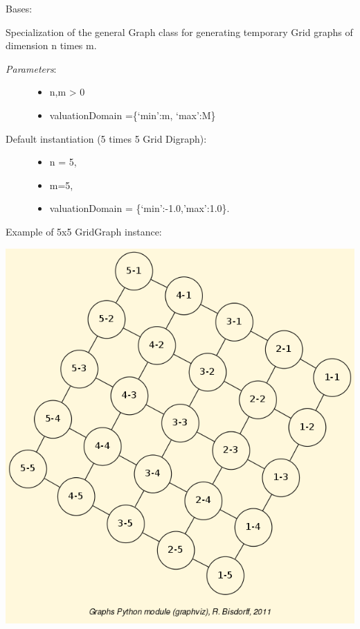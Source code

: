 \documentclass[letterpaper,10pt,english]{sphinxmanual}
\begin{document}
\begin{fulllineitems}
\label{techDoc:graphs.GridGraph}
Bases: {\hyperref[techDoc:graphs.Graph]{}}

Specialization of the general Graph class for generating
temporary Grid graphs of dimension n times m.
\begin{description}
\item[{\emph{Parameters}:}] \leavevmode\begin{itemize}
\item {} 
n,m \textgreater{} 0

\item {} 
valuationDomain =\{`min':m, `max':M\}

\end{itemize}

\item[{Default instantiation (5 times 5 Grid Digraph):}] \leavevmode\begin{itemize}
\item {} 
n = 5,

\item {} 
m=5,

\item {} 
valuationDomain = \{`min':-1.0,'max':1.0\}.

\end{itemize}

\end{description}

Example of 5x5 GridGraph instance:

{\hfill\includegraphics{grid-5-5.png}\hfill}


\end{fulllineitems}
\end{document}
